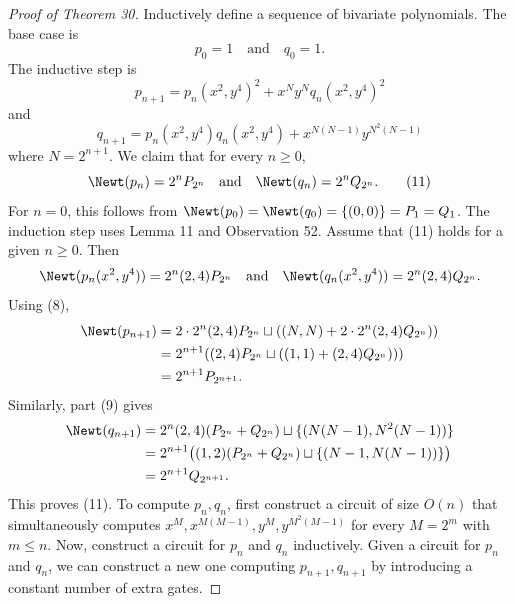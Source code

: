 \begin{proof}[Proof of Theorem 30]
Inductively define a sequence of bivariate polynomials. The base case is
\[p_0=1\quad\text{and}\quad q_0=1.\]
The inductive step is
\[p_{n+1}=p_n(x^2,y^4)^2+x^Ny^Nq_n(x^2,y^4)^2\]
and
\[q_{n+1}=p_n(x^2,y^4)q_n(x^2,y^4)+x^{N(N-1)}y^{N^2(N-1)}\]
where $N=2^{n+1}$.
We claim that for every $n\ge0$,
\begin{equation}
\Newt(p_n)=2^nP_{2^n}\quad\text{and}\quad\Newt(q_n)=2^nQ_{2^n}.\tag{11}
\end{equation}
For $n=0$, this follows from $\Newt(p_0)=\Newt(q_0)=\{(0,0)\}=P_1=Q_1$. The induction step uses Lemma 11 and Observation 52. Assume that (11) holds for a given $n\ge0$. Then
\[\Newt(p_n(x^2,y^4))=2^n(2,4)P_{2^n}\quad\text{and}\quad\Newt(q_n(x^2,y^4))=2^n(2,4)Q_{2^n}.\]
Using (8),
\begin{align*}
\Newt(p_{n+1})&=2\cdot2^n(2,4)P_{2^n}\sqcup((N,N)+2\cdot2^n(2,4)Q_{2^n}))\\
&=2^{n+1}((2,4)P_{2^n}\sqcup((1,1)+(2,4)Q_{2^n})))\\
&=2^{n+1}P_{2^{n+1}}.
\end{align*}
Similarly, part (9) gives
\begin{align*}
\Newt(q_{n+1})&=2^n(2,4)(P_{2^n}+Q_{2^n})\sqcup\{(N(N-1),N^2(N-1))\}\\
&=2^{n+1}\big((1,2)(P_{2^n}+Q_{2^n})\sqcup\{(N-1,N(N-1))\}\big)\\
&=2^{n+1}Q_{2^{n+1}}.
\end{align*}
This proves (11).
To compute $p_n,q_n$, first construct a circuit of size $O(n)$ that simultaneously computes $x^M,x^{M(M-1)},y^M,y^{M^2(M-1)}$ for every $M=2^m$ with $m\le n$. Now, construct a circuit for $p_n$ and $q_n$ inductively. Given a circuit for $p_n$ and $q_n$, we can construct a new one computing $p_{n+1},q_{n+1}$ by introducing a constant number of extra gates.
\end{proof}
